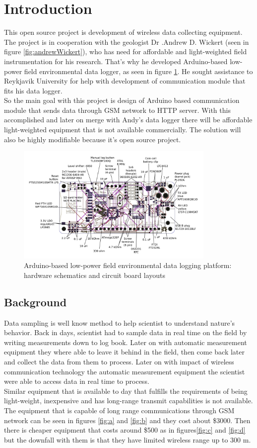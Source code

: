 \section{Introduction}
This open source project is development of wireless data collecting equipment. The project is in cooperation with the geologist Dr .Andrew D. Wickert (seen in figure \ref{fig:andrewWickert}), who has need for affordable and light-weighted field instrumentation for his research. That's why he developed Arduino-based low-power field environmental data logger, as seen in figure \ref{fig:BottleLog}. He sought assistance to Reykjavik University for help with development of communication module that fits his data logger.\\
So the main goal with this project is design of Arduino based communication module that sends data through GSM network to HTTP server. With this accomplished and later on merge with Andy's data logger there will be affordable light-weighted equipment that is not available commercially. The solution will also be highly modifiable because it's open source project.

\begin{figure}
\centering
\includegraphics[height=5.7cm]{graphics/ALog_drawing}
\caption{Arduino-based low-power field environmental data logging platform: hardware schematics and circuit board layouts\label{fig:BottleLog}\cite{ALog-BottleLogger}}
\end{figure}

\subsection{Background}
Data sampling is well know method to help scientist to understand nature's behavior. Back in days, scientist had to sample data in real time on the field by writing measurements down to log book. Later on with automatic measurement equipment they where able to leave it behind in the field, then come back later and collect the data from them to process. Later on with impact of wireless communication technology the automatic measurement equipment the scientist were able to access data in real time to process.\\
Similar equipment that is available to day that fulfills the requirements of being light-weight, inexpensive and has long-range transmit capabilities is not available. The equipment that is capable of long range communications through GSM network can be seen in figures \ref{fig:a} and \ref{fig:b} and they cost about \$3000. Then there is cheaper equipment that costs around \$500 as in figures\ref{fig:c} and  \ref{fig:d} but the downfall with them is that they have limited wireless range up to 300 m.


